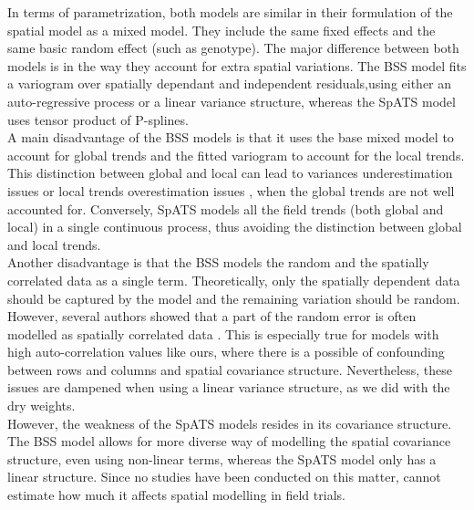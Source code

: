 In terms of parametrization, both models are similar in their formulation of the spatial model as a mixed model. They include the same fixed effects and the same basic random effect (such as genotype). The major difference between both models is in the way they account for extra spatial variations. The BSS model fits a variogram over spatially dependant and independent residuals,using either an auto-regressive process or a linear variance structure, whereas the SpATS model uses tensor product of P-splines.\\

A main disadvantage of the BSS models is that it uses the base mixed model to account for global trends and the fitted variogram to account for the local trends. This distinction between global and local can lead to variances underestimation issues \parencite{zimmerman_random_1991} or local trends overestimation issues \parencite{gumpertz1991raleigh}, when the global trends are not well accounted for. Conversely, SpATS models all the field trends (both global and local) in a single continuous process, thus avoiding the distinction between global and local trends.\\

Another disadvantage is that the BSS models the random and the spatially correlated data as a single term. Theoretically, only the spatially dependent data should be captured by the model and the remaining variation should be random. However, several authors showed that a part of the random error is often modelled as spatially correlated data \parencite{cullis_spatial_1998,piepho_problems_2015}. This is especially true for models with high auto-correlation values like ours, where there is a possible of confounding between rows and columns and spatial covariance structure. Nevertheless, these issues are dampened when using a linear variance structure, as we did with the dry weights.\\

However, the weakness of the SpATS models resides in its covariance structure. The BSS model allows for more diverse way of modelling the spatial covariance structure, even using non-linear terms, whereas the SpATS model only has a linear structure. Since no studies have been conducted on this matter, \textcite{velazco_modelling_2017} cannot estimate how much it affects spatial modelling in field trials.
 